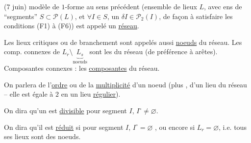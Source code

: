 
(7 juin)  modèle de $1$-forme au sens précédent (ensemble de lieux $L$, avec ens de ``segments'' $S\subset\mathcal P(L)$, et $\forall I\in S$, un $\delta I\in\mathcal P_2(I)$,  de façon à satisfaire les conditions (F1) à (F6)) est appelé un \uline{réseau}.

Les lieux critiques  ou de branchement sont appelés aussi \uline{noeuds} du réseau. Les comp. connexes de $L_r\setminus\underset{\text{noeuds}}{\underbrace{L_s}}$ sont  les  du réseau (de préférence à arêtes). Composantes connexes : les \uline{composantes} du réseau.

On parlera de l'\uline{ordre} ou de la \uline{multiplicité} d'un noeud (plus , d'un lieu du réseau -- elle est égale à $2$ en un lieu \uline{régulier}).

On dira qu'un   est \uline{divisible}  pour  segment $I$, $I^\circ\ne\varnothing$.

On dira qu'il est \uline{réduit} si pour  segment $I$, $I^\circ=\varnothing$ , ou encore si $L_r=\varnothing$, i.e. tous ses lieux sont des noeuds.


